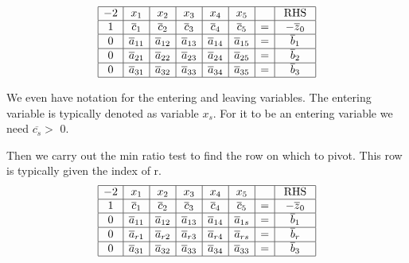 \documentclass{article}
\begin{document}
$$
\begin{array} { | c | c | c | c | c | c | c | c |} \hline - 2 & { x _ { 1 } } & { x _ { 2 } } & { x _ { 3 } } & { x _ { 4 } } & { x _ { 5 } } & { } & { \text { RHS } } \\ \hline 1 & { \overline { c } _ { 1 } } & { \overline { c } _ { 2 } } & { \overline { c } _ { 3 } } & { \overline { c } _ { 4 } } & { \overline { c } _ { 5 } } & { = } & {  - \overline {z} _ { 0 } }   \\ \hline { 0 } & { \overline { a } _ { 11 } } & { \overline { a } _ { 12 } } & { \overline { a } _ { 13 } } & { \overline { a } _ { 14 } } & { \overline { a } _ { 15 } } & { = } & { \overline { b } _ { 1 } } \\ \hline 0 & { \overline { a } _ { 21 } } & { \overline { a } _ { 22 } } & { \overline { a } _ { 23 } } & { \overline { a } _ { 24 } } & { \overline { a } _ { 25 } } & { = } & { \overline { b } _ { 2 } } \\ \hline 0 & { \overline { a } _ { 31 } } & { \overline { a } _ { 32 } } & { \overline { a } _ { 33 } } & { \overline { a } _ { 34 } } & { \overline { a } _ { 35 } } & { = } & { \overline { b } _ { 3 } } \\ \hline \end{array}
$$

We even have notation for the entering and leaving variables.  The entering variable is typically denoted as variable $x_s$.  For it to be an entering variable we need $\overline{c_s} >$ 0.


Then we carry out the min ratio test to find the row on which to pivot.  This row is typically given the index of r.
$$
\begin{array} { | c | c | c | c | c | c | c | c | } \hline - 2 & { x _ { 1 } } & { x _ { 2 } } & { x _ { 3 } } & { x _ { 4 } } & { x _ { 5 } } & { } & { \text { RHS } } \\ \hline 1 & { \overline { c } _ { 1 } } & { \overline { c } _ { 2 } } & { \overline { c } _ { 3 } } & { \overline { c } _ { 4 } } & { \overline { c } _ { 5 } } & { = } & { - \overline { z } _ { 0 } } \\ \hline { 0 } & { \overline { a } _ { 11 } } & { \overline { a } _ { 12 } } & { \overline { a } _ { 13 } } & { \overline { a } _ { 14 } } & { \overline { a } _ { 1 s } } & { = } & { \overline { b } _ { 1 } } \\ \hline 0 & {{\overline{ a} _ { r1 } } } & { \overline { a } _ { r2 } } & { \overline { a } _ { r3 } } & { \overline { a } _ { r4 } } & { \overline { a } _ { r s } } & {=}&{   { \overline { b } _ { r } }  } \\ \hline { 0 } & { \overline { a } _ { 31 } } & { \overline { a } _ { 32 } } & { \overline { a } _ { 33 } } & { \overline { a } _ { 34 } } & { \overline { a } _ { 33 } } & { = } & { \overline { b } _ { 3 } } \\ \hline \end{array}
$$
\end{document}
